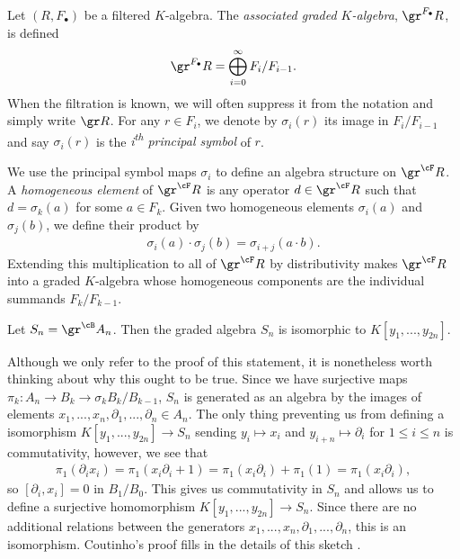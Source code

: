 \begin{defn}\label{defn:assoc-graded}
	Let $(R, F_\bullet)$ be a filtered $K$-algebra. The \emph{associated graded $K$-algebra}, $\gr^{F_\bullet} R$, is defined
	\begin{align*}
		\gr^{F_\bullet} R = \bigoplus^{\infty}_{i=0} F_i/F_{i-1}.
	\end{align*}
	When the filtration is known, we will often suppress it from the notation and simply write $\gr R$. For any $r \in F_i$, we denote by $\sigma_i(r)$ its image in $F_i/F_{i-1}$ and say $\sigma_i(r)$ is the \emph{i\textsuperscript{th} principal symbol} of $r$.
\end{defn}
We use the principal symbol maps $\sigma_i$ to define an algebra structure on $\gr^\cF R$. A \emph{homogeneous element} of $\gr^\cF R$ is any operator $d \in \gr^\cF R$ such that $d = \sigma_k(a)$ for some $a \in F_k$. Given two homogeneous elements $\sigma_i(a)$ and $\sigma_j(b)$, we define their product by
\begin{align*}
	\sigma_i(a)\cdot \sigma_j(b) = \sigma_{i+j}(a\cdot b).
\end{align*}
Extending this multiplication to all of $\gr^\cF R$ by distributivity makes $\gr^\cF R$ into a graded $K$-algebra whose homogeneous components are the individual summands $F_k/F_{k-1}$.

\begin{comment}
\begin{rmk}\label{rmk:two-filtrations-yield-same-assoc-graded}
	Given that the notation $\gr A$ makes no reference to the choice of filtration, one would hope that $\gr A$ is independent of the specific filtration chosen, and indeed it is. 
\end{rmk}
\end{comment}

\begin{example}\label{example:graded-algebra-of-Weyl-algebra}
	Let $S_n = \gr^\cB A_n$. Then the graded algebra $S_n$ is isomorphic to $K[y_1,...,y_{2n}]$. 

	Although we only refer to the proof of this statement, it is nonetheless worth thinking about why this ought to be true. Since we have surjective maps $\pi_k:A_n\to B_k \to{\sigma_k} B_k/B_{k-1}$, $S_n$ is generated as an algebra by the images of elements $x_1,...,x_n,\partial_1,...,\partial_n \in A_n$. The only thing preventing us from defining a isomorphism $K[y_1,...,y_{2n}]\to S_n$ sending $y_i\mapsto x_i$ and $y_{i+n}\mapsto \partial_{i}$ for $1\leq i\leq n$ is commutativity, however, we see that
	\begin{align*}
		\pi_1(\partial_i x_i) = \pi_1(x_i\partial_i + 1) = \pi_1(x_i\partial_i) + \pi_1(1) = \pi_1(x_i\partial_i),
	\end{align*}
	so $[\partial_i,x_i] = 0$ in $B_1/B_0$. This gives us commutativity in $S_n$ and allows us to define a surjective homomorphism $K[y_1,...,y_{2n}] \to S_n$. Since there are no additional relations between the generators $x_1,...,x_n,\partial_1,...,\partial_n$, this is an isomorphism. Coutinho's proof fills in the details of this sketch \cite[pg. 58]{d-mod-primer}.
\end{example}

